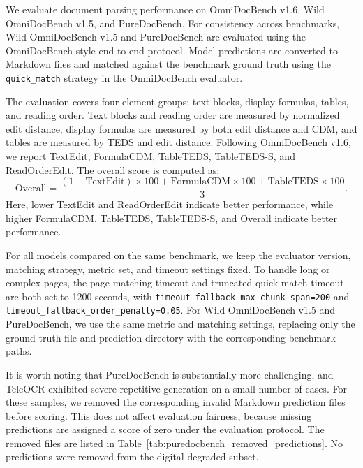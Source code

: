 \documentclass{fairmeta}
\begin{document}
We evaluate document parsing performance on OmniDocBench v1.6, Wild OmniDocBench v1.5, and PureDocBench. For consistency across benchmarks, Wild OmniDocBench v1.5 and PureDocBench are evaluated using the OmniDocBench-style end-to-end protocol. Model predictions are converted to Markdown files and matched against the benchmark ground truth using the \texttt{quick\_match} strategy in the OmniDocBench evaluator.

The evaluation covers four element groups: text blocks, display formulas, tables, and reading order. Text blocks and reading order are measured by normalized edit distance, display formulas are measured by both edit distance and CDM, and tables are measured by TEDS and edit distance. Following OmniDocBench v1.6, we report TextEdit, FormulaCDM, TableTEDS, TableTEDS-S, and ReadOrderEdit. The overall score is computed as:
\[
\mathrm{Overall} =
\frac{(1-\mathrm{TextEdit}) \times 100
+ \mathrm{FormulaCDM} \times 100
+ \mathrm{TableTEDS} \times 100}{3}.
\]
Here, lower TextEdit and ReadOrderEdit indicate better performance, while higher FormulaCDM, TableTEDS, TableTEDS-S, and Overall indicate better performance.

For all models compared on the same benchmark, we keep the evaluator version, matching strategy, metric set, and timeout settings fixed. To handle long or complex pages, the page matching timeout and truncated quick-match timeout are both set to 1200 seconds, with \texttt{timeout\_fallback\_max\_chunk\_span=200} and \texttt{timeout\_fallback\_order\_penalty=0.05}. For Wild OmniDocBench v1.5 and PureDocBench, we use the same metric and matching settings, replacing only the ground-truth file and prediction directory with the corresponding benchmark paths.

It is worth noting that PureDocBench is substantially more challenging, and TeleOCR exhibited severe repetitive generation on a small number of cases. For these samples, we removed the corresponding invalid Markdown prediction files before scoring. This does not affect evaluation fairness, because missing predictions are assigned a score of zero under the evaluation protocol. The removed files are listed in Table~\ref{tab:puredocbench_removed_predictions}. No predictions were removed from the digital-degraded subset.
\end{document}

